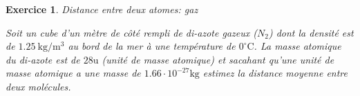 \documentclass[a4paper,12pt]{book}
\newtheorem{exercice}{Exercice}
\newcommand{\m}{\mathrm{m}}
\newcommand{\kg}{\mathrm{kg}}
\newcommand{\C}{\mathrm{C}}
\begin{document}
\begin{exercice}{Distance entre deux atomes: gaz}

Soit un cube d'un mètre de côté rempli de di-azote gazeux ($N_2$) dont la densité est de 
$1.25\ \kg/\m^3$ au bord de la mer à une température de $0^\circ\C$. La masse atomique du di-azote est de $28\mathrm{u}$ (unité de masse atomique) et 
sacahant qu'une unité de masse atomique a une masse de $1.66\cdot 10^{-27}\kg$ estimez
la distance moyenne entre deux molécules.
\end{exercice}
\end{document}
